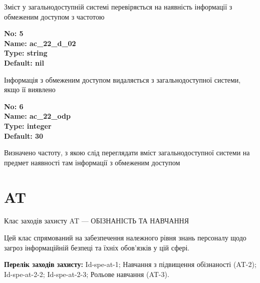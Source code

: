 \documentclass{article}
\begin{document}
{\footnotesize Зміст у загальнодоступній системі перевіряється на наявність інформації з обмеженим доступом з частотою}


{\footnotesize\bfseries
No: 5\\
Name: ac\_\allowbreak{}22\_\allowbreak{}d\_\allowbreak{}02\\
Type: string\\
Default: nil
}

{\footnotesize Інформація з обмеженим доступом видаляється з загальнодоступної системи, якщо її виявлено}


{\footnotesize\bfseries
No: 6\\
Name: ac\_\allowbreak{}22\_\allowbreak{}odp\\
Type: integer\\
Default: 30
}

{\footnotesize Визначено частоту, з якою слід переглядати вміст загальнодоступної системи на предмет наявності там інформації з обмеженим доступом}




\section{AT}
Клас заходів захисту AT --- ОБІЗНАНІСТЬ ТА НАВЧАННЯ

Цей клас спрямований на забезпечення належного рівня знань персоналу щодо загроз інформаційній безпеці та їхніх обов'язків у цій сфері.

\textbf{Перелік заходів захисту:} Id-spe-at-1; Навчання з підвищення обізнаності (AT-2); Id-spe-at-2-2; Id-spe-at-2-3; Рольове навчання (AT-3).
\end{document}
